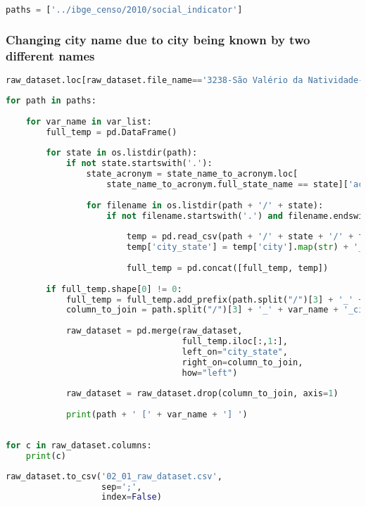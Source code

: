 \begin{lstlisting}[language=Python]
paths = ['../ibge_censo/2010/social_indicator']
\end{lstlisting}

\subsubsection{Changing city name due to city being known by two
different
names}\label{changing-city-name-due-to-city-being-known-by-two-different-names}

\begin{lstlisting}[language=Python]
raw_dataset.loc[raw_dataset.file_name=='3238-São Valério da Natividade-TO.pdf', 'city_state'] = 'sao valerio_to'
\end{lstlisting}

\begin{lstlisting}[language=Python]
for path in paths:
    
    for var_name in var_list:
        full_temp = pd.DataFrame()
        
        for state in os.listdir(path):
            if not state.startswith('.'):
                state_acronym = state_name_to_acronym.loc[
                    state_name_to_acronym.full_state_name == state]['acronym'].values[0]
                
                for filename in os.listdir(path + '/' + state):
                    if not filename.startswith('.') and filename.endswith(var_name + '.csv'):
                        
                        temp = pd.read_csv(path + '/' + state + '/' + filename)
                        temp['city_state'] = temp['city'].map(str) + '_' + state_acronym
                        
                        full_temp = pd.concat([full_temp, temp])
                        
        if full_temp.shape[0] != 0:
            full_temp = full_temp.add_prefix(path.split("/")[3] + '_' + var_name + '_')
            column_to_join = path.split("/")[3] + '_' + var_name + '_city_state'
            
            raw_dataset = pd.merge(raw_dataset,
                                   full_temp.iloc[:,1:],
                                   left_on="city_state",
                                   right_on=column_to_join,
                                   how="left")
            
            raw_dataset = raw_dataset.drop(column_to_join, axis=1)
            
            print(path + ' [' + var_name + '] ')
        
\end{lstlisting}

\begin{lstlisting}[language=Python]
for c in raw_dataset.columns:
    print(c)
\end{lstlisting}

\begin{lstlisting}[language=Python]
raw_dataset.to_csv('02_01_raw_dataset.csv',
                   sep=';',
                   index=False)
\end{lstlisting}

